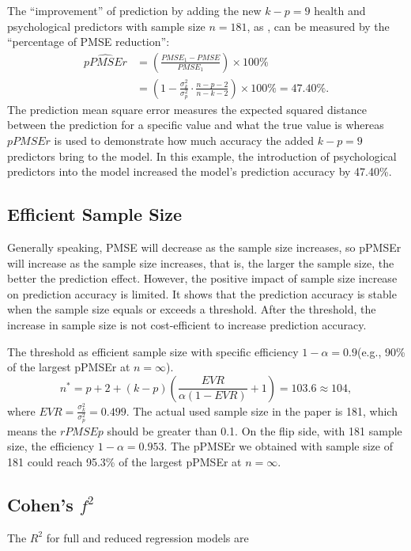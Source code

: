 The “improvement” of prediction by adding the new $k-p=9$ health and psychological predictors with sample size $n = 181$, as \cite{baker2008chronicpain}, can be measured by the “percentage of PMSE reduction”:
$$\begin{aligned}
\hat{pPMSEr} &= \left(\frac{PMSE_1 - PMSE}{PMSE_1} \right)\times 100\%\\
&= \left(1 - \frac{\sigma_k^2}{\sigma_p^2} \cdot \frac{n-p-2}{n-k-2}\right)\times 100\% = 47.40\%.
\end{aligned}$$
The prediction mean square error measures the expected squared distance between the prediction for a specific value and what the true value is whereas $pPMSEr$ is used to demonstrate how much accuracy the added $k-p = 9$ predictors bring to the model. In this example, the introduction of psychological predictors into the model increased the model's prediction accuracy by 47.40\%.

\subsection{Efficient Sample Size}
Generally speaking, PMSE will decrease as the sample size increases, so pPMSEr will increase as the sample size increases, that is, the larger the sample size, the better the prediction effect. However, the positive impact of sample size increase on prediction accuracy is limited. It shows that the prediction accuracy is stable when the sample size equals or exceeds a threshold. After the threshold, the increase in sample size is not cost-efficient to increase prediction accuracy. 

The threshold as efficient sample size with specific efficiency $1-\alpha = 0.9 $(e.g., 90\% of the largest pPMSEr at $n=\infty$). 
$$
n^* = p+2+(k-p)\left(\frac{EVR}{\alpha(1-EVR)}+1\right) = 103.6\approx 104,
$$
where $EVR = \frac{\sigma_k^2}{\sigma_p^2}=0.499$.
The actual used sample size in the paper is 181, which means the $rPMSEp$ should be greater than 0.1. On the flip side, with 181 sample size, the efficiency $1-\alpha = 0.953$. The pPMSEr we obtained with sample size of 181 could reach 95.3\% of the largest pPMSEr at $n=\infty$.


\subsection{Cohen's $f^2$}

The $R^2$ for full and reduced regression models are 

